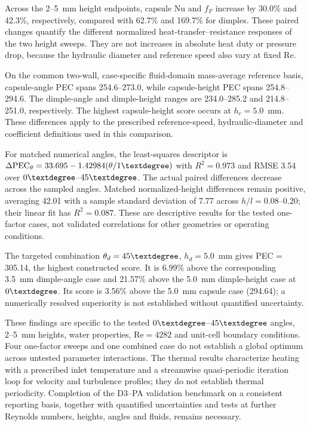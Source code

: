 \documentclass[energies,article,submit,moreauthors,noheaderline]{Definitions/mdpi}
\newcommand{\degree}{\texorpdfstring{\ensuremath{^\circ}}{\textdegree}}
\def\ensuremath#1{}%
\def\degree{\textdegree}%
\begin{document}
Across the 2--5~mm height endpoints, capsule Nu and $f_F$ increase by 30.0\% and 42.3\%, respectively, compared with 62.7\% and 169.7\% for dimples. These paired changes quantify the different normalized heat-transfer--resistance responses of the two height sweeps. They are not increases in absolute heat duty or pressure drop, because the hydraulic diameter and reference speed also vary at fixed Re.

On the common two-wall, case-specific fluid-domain mass-average reference basis, capsule-angle PEC spans 254.6--273.0, while capsule-height PEC spans 254.8--294.6. The dimple-angle and dimple-height ranges are 234.0--285.2 and 214.8--251.0, respectively. The highest capsule-height score occurs at $h_c=5.0$~mm. These differences apply to the prescribed reference-speed, hydraulic-diameter and coefficient definitions used in this comparison.

For matched numerical angles, the least-squares descriptor is $\Delta\mathrm{PEC}_{\theta}=33.695-1.42984(\theta/1\degree)$ with $R^2=0.973$ and RMSE 3.54 over $0\degree$--$45\degree$. The actual paired differences decrease across the sampled angles. Matched normalized-height differences remain positive, averaging 42.01 with a sample standard deviation of 7.77 across $h/l=0.08$--$0.20$; their linear fit has $R^2=0.087$. These are descriptive results for the tested one-factor cases, not validated correlations for other geometries or operating conditions.

The targeted combination $\theta_d=45\degree$, $h_d=5.0$~mm gives PEC = 305.14, the highest constructed score. It is 6.99\% above the corresponding 3.5~mm dimple-angle case and 21.57\% above the 5.0~mm dimple-height case at $0\degree$. Its score is 3.56\% above the 5.0~mm capsule case (294.64); a numerically resolved superiority is not established without quantified uncertainty.

These findings are specific to the tested $0\degree$--$45\degree$ angles, 2--5~mm heights, water properties, $\mathrm{Re}=4282$ and unit-cell boundary conditions. Four one-factor sweeps and one combined case do not establish a global optimum across untested parameter interactions. The thermal results characterize heating with a prescribed inlet temperature and a streamwise quasi-periodic iteration loop for velocity and turbulence profiles; they do not establish thermal periodicity. Completion of the D3--PA validation benchmark on a consistent reporting basis, together with quantified uncertainties and tests at further Reynolds numbers, heights, angles and fluids, remains necessary.
\end{document}
